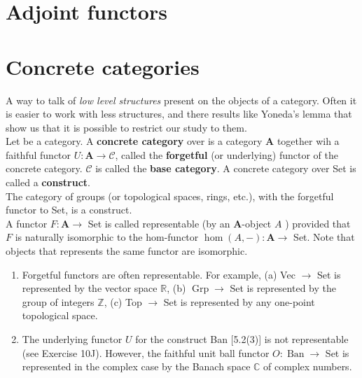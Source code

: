 \section{Adjoint functors}







\section{Concrete categories}

A way to talk of \textit{low level structures} present on the objects of a category. Often it is easier to work with less structures, and there results like Yoneda's lemma that show us that it is possible to restrict our study to them.\\

Let \cc be a category. A \textbf{concrete category} over \cc is a category $\mathbf{A}$ together wih a faithful functor $U: \mathbf{A} \rightarrow \mathcal{C}$, called the \textbf{forgetful} (or underlying) functor of the concrete category. $\mathcal{C}$ is called the \textbf{base category}. A concrete category over Set is called a \textbf{construct}.\\
The category of groups (or topological spaces, rings, etc.), with the forgetful functor to Set, is a construct.\\

A functor $F: \mathbf{A} \rightarrow$ Set is called representable (by an $\mathbf{A}$-object $A$ ) provided that $F$ is naturally isomorphic to the hom-functor $\operatorname{hom}(A,-): \mathbf{A} \rightarrow$ Set. Note that objects that represents the same functor are isomorphic.\\

\begin{example}
    \begin{enumerate}
        \item Forgetful functors are often representable. For example,
        (a) Vec $\rightarrow$ Set is represented by the vector space $\mathbb{R}$,
        (b) $\operatorname{Grp} \rightarrow$ Set is represented by the group of integers $\mathbb{Z}$,
        (c) Top $\rightarrow$ Set is represented by any one-point topological space.
        \item The underlying functor $U$ for the construct Ban [5.2(3)] is not representable (see Exercise 10J). However, the faithful unit ball functor $O: \operatorname{Ban} \rightarrow$ Set is represented in the complex case by the Banach space $\mathbb{C}$ of complex numbers.
    \end{enumerate}
\end{example}

